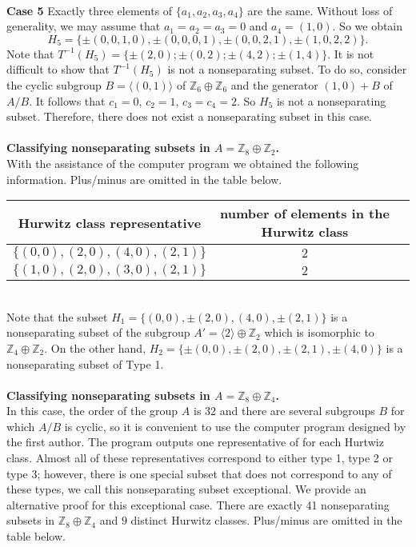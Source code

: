 \documentclass[article,dvisp]{amsart}
\def\Z{\mathbb{Z}}
\theoremstyle{definition}
\theoremstyle{remark}
\numberwithin{equation}{section}
\theoremstyle{lemma}
\begin{document}
\\
\textbf{Case 5} Exactly three elements of $\{a_{1},a_{2},a_{3},a_{4}\}$ are the same. Without loss of generality, we may assume that $a_{1}=a_{2}=a_{3}=0$ and $a_{4}=(1,0)$. So we obtain
$$H_{5}=\{\pm(0,0,1,0),\pm(0,0,0,1),\pm(0,0,2,1),\pm(1,0,2,2)\}.$$
Note that $T^{-1}(H_{5})=\{\pm (2,0);\pm(0,2);\pm(4,2);\pm(1,4)\}$. It is not difficult to show that $T^{-1}(H_{5})$ is not a nonseparating subset. To do so, consider the cyclic subgroup $B=\langle(0,1)\rangle$ of $\Z_{6}\oplus \Z_{6}$ and the generator $(1,0)+B$ of $A/B$. It follows that $c_{1}=0$, $c_{2}=1$, $c_{3}=c_{4}=2$. So $H_{5}$ is not a nonseparating subset. Therefore, there does not exist a nonseparating subset in this case.\\
\\
\textbf{Classifying nonseparating subsets in $A=\Z_{8}\oplus \Z_{2}$.}\vspace{.05in}\\
With the assistance of the computer program we obtained the following information. Plus/minus are omitted in the table below.
\begin{center}
\begin{tabular}{|c|c|c|}
\hline
Hurwitz class representative&number of elements in the Hurwitz class\\
\hline
$\{(0,0),(2,0),(4,0),(2,1)\}$&$2$\\
\hline
$\{(1,0),(2,0),(3,0),(2,1)\}$&$2$\\
\hline
\end{tabular}
\end{center}\
\\
Note that the subset $H_{1}=\{(0,0),\pm(2,0),(4,0),\pm(2,1)\}$ is a nonseparating subset of the subgroup $A'=\langle2\rangle\oplus\Z_{2}$ which is isomorphic to $\Z_{4}\oplus\Z_{2}$. On the other hand, $H_{2}=\{\pm(0,0),\pm(2,0),\pm(2,1), \pm(4,0)\}$ is a nonseparating subset of Type 1.\\
\\
\textbf{Classifying nonseparating subsets in $A=\Z_{8}\oplus\Z_{4}$.}\vspace{.05in}\\
In this case, the order of the group $A$ is 32 and there are several subgroups $B$ for which $A/B$ is cyclic, so it is convenient to use the computer program designed by the first author. The program outputs one representative of for each Hurtwiz class. Almost all of these representatives correspond to either type 1, type 2 or type 3; however, there is one special subset that does not correspond to any of these types, we call this nonseparating subset exceptional. We provide an alternative proof for this exceptional case. There are exactly 41 nonseparating subsets in $\Z_{8}\oplus\Z_{4}$ and $9$ distinct Hurwitz classes. Plus/minus are omitted in the table below.\\
\end{document}
